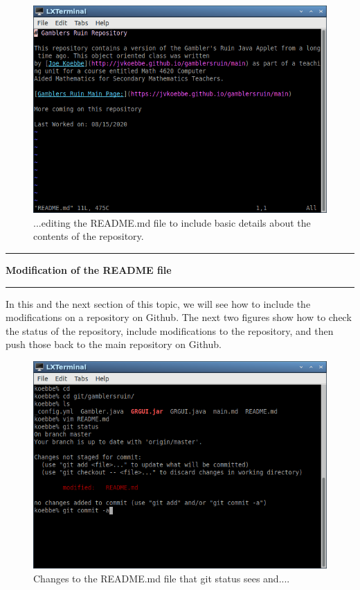 \documentclass[10pt,fleqn]{article}
\begin{document}
\vfill
\begin{figure}[h]
\centering
\includegraphics[width=5.0in]{../images/git_12.png}
\caption{...editing the README.md file to include basic details about the
contents of the repository.}
\end{figure}
\eject
\vskip0.1in\hrule\vskip0.1in\noindent
{\bf Modification of the README file} 
\vskip0.1in\hrule\vskip0.1in\noindent
In this and the next section of this topic, we will see how to include the
modifications on a repository on Github. The next two figures show how to check
the status of the repository, include modifications to the repository, and then
push those back to the main repository on Github.
\vfill
\begin{figure}[h]
\centering
\includegraphics[width=5.0in]{../images/git_13.png}
\caption{Changes to the README.md file that git status sees and....}
\end{figure}
\end{document}
